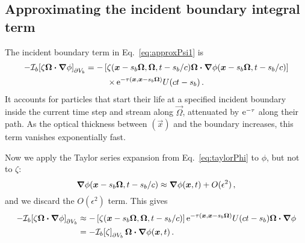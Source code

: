\subsection{Approximating the incident boundary integral term}
The incident boundary term in Eq.~\eqref{eq:approxPsi1} is
\begin{multline*}
-\mathcal{I}_{b}\!\left[\zeta \bm{\Omega}\bm{\cdot} \bm{\nabla} \phi\right]_{\partial V_b}
  = -\left[\zeta(\bm{x} - s_b\bm{\Omega}, \bm{\Omega}, t - s_b/c)
   \bm{\Omega}\bm{\cdot} \bm{\nabla} \phi(\bm{x} - s_b\bm{\Omega}, t - s_b/c) \right]
   \\
\times
    \mathop{}\!\mathrm{e}^{ -\tau(\bm{x}, \bm{x} - s_b \bm{\Omega})}
    U(ct - s_b) \,.
\end{multline*}
It accounts for particles that start their life at a specified incident boundary
inside the current time step and stream along $\vec{\Omega}$, attenuated by
$\mathop{}\!\mathrm{e}^{-\tau}$ along their path. As the optical thickness between
$(\vec{x})$ and the boundary increases, this term vanishes
exponentially fast.

Now we apply the Taylor series expansion from Eq.~\eqref{eq:taylorPhi} to
$\phi$, but not to $\zeta$:
\begin{equation*}
  \bm{\nabla} \phi(\bm{x} - s_b\bm{\Omega}, t - s_b/c)
  \approx \bm{\nabla} \phi(\bm{x}, t) + O(\epsilon^2)\,,
\end{equation*}
and we discard the $O(\epsilon^2)$ term. This gives
\begin{align} \nonumber
-\mathcal{I}_{b}\!\left[\zeta \bm{\Omega}\bm{\cdot} \bm{\nabla} \phi\right]_{\partial V_b}
&\approx -\left[\zeta(\bm{x} - s_b\bm{\Omega}, \bm{\Omega}, t - s_b/c) \right]
  \mathop{}\!\mathrm{e}^{ -\tau(\bm{x}, \bm{x} - s_b \bm{\Omega})} U(ct - s_b)
  \bm{\Omega}\bm{\cdot} \bm{\nabla} \phi
 \\ \label{eq:bndyApprox}
&= -\mathcal{I}_{b}\!\left[\zeta\right]_{\partial V_b} \bm{\Omega}\bm{\cdot} \bm{\nabla} \phi(\bm{x}, t) \,.
\end{align}

